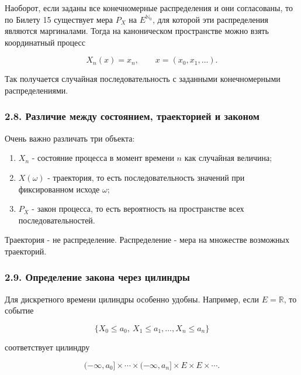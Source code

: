 \documentclass[
  11pt,
  a4paper,
]{article}
\providecommand{\tightlist}{%
  \setlength{\itemsep}{0pt}\setlength{\parskip}{0pt}}
\begin{document}
Наоборот, если заданы все конечномерные распределения и они согласованы,
то по Билету 15 существует мера \(P_X\) на \(E^{\mathbb N_0}\), для
которой эти распределения являются маргиналами. Тогда на каноническом
пространстве можно взять координатный процесс

\[
X_n(x)=x_n,
\qquad
x=(x_0,x_1,\ldots).
\]

Так получается случайная последовательность с заданными конечномерными
распределениями.

\subsubsection{2.8. Различие между состоянием, траекторией и
законом}\label{ux440ux430ux437ux43bux438ux447ux438ux435-ux43cux435ux436ux434ux443-ux441ux43eux441ux442ux43eux44fux43dux438ux435ux43c-ux442ux440ux430ux435ux43aux442ux43eux440ux438ux435ux439-ux438-ux437ux430ux43aux43eux43dux43eux43c}

Очень важно различать три объекта:

\begin{enumerate}
\def\labelenumi{\arabic{enumi}.}
\tightlist
\item
  \(X_n\) - состояние процесса в момент времени \(n\) как случайная
  величина;
\item
  \(X(\omega)\) - траектория, то есть последовательность значений при
  фиксированном исходе \(\omega\);
\item
  \(P_X\) - закон процесса, то есть вероятность на пространстве всех
  последовательностей.
\end{enumerate}

Траектория - не распределение. Распределение - мера на множестве
возможных траекторий.

\subsubsection{2.9. Определение закона через
цилиндры}\label{ux43eux43fux440ux435ux434ux435ux43bux435ux43dux438ux435-ux437ux430ux43aux43eux43dux430-ux447ux435ux440ux435ux437-ux446ux438ux43bux438ux43dux434ux440ux44b}

Для дискретного времени цилиндры особенно удобны. Например, если
\(E=\mathbb R\), то событие

\[
\{X_0\le a_0,\ X_1\le a_1,\ldots,X_n\le a_n\}
\]

соответствует цилиндру

\[
(-\infty,a_0]\times\cdots\times(-\infty,a_n]\times E\times E\times\cdots.
\]
\end{document}
